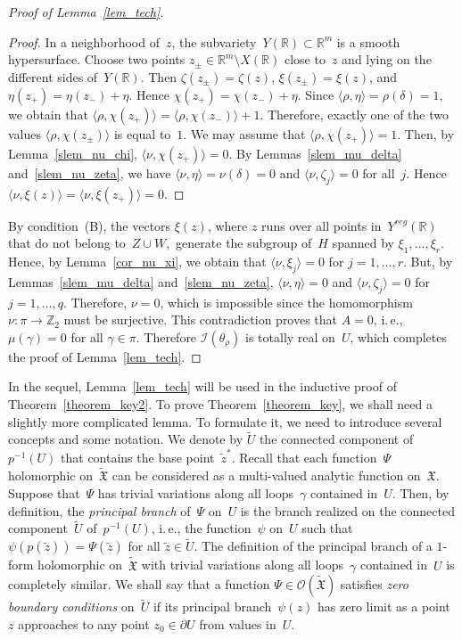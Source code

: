 \documentclass[reqno,tbtags,12pt]{amsart}
\numberwithin{equation}{section}
\newcommand{\R}{\mathbb{R}}
\newcommand{\Z}{\mathbb{Z}}
\newcommand{\FX}{\mathfrak{X}}
\newcommand{\tFX}{\widetilde{\mathfrak{X}}}
\newcommand{\CO}{\mathcal{O}}
\newcommand{\tU}{\widetilde{U}}
\newcommand{\I}{\mathcal{I}}
\newcommand{\tz}{\tilde{z}}
\theoremstyle{definition}
\begin{document}
\begin{proof}[Proof of Lemma~\ref{lem_tech}]
\begin{proof}
In a neighborhood of~$z$, the subvariety~$Y(\R)\subset\R^m$ is a smooth hypersurface. Choose two points $z_{\pm}\in \R^m\setminus X(\R)$ close to~$z$ and lying on the different sides of~$Y(\R)$. Then $\zeta(z_{\pm})=\zeta(z)$, $\xi(z_{\pm})=\xi(z)$, and $\eta(z_{+})= \eta(z_-)+\eta$. Hence $\chi(z_+)=\chi(z_-)+\eta$. Since $\langle\rho,\eta\rangle=\rho(\delta)=1$, we obtain that $\langle\rho,\chi(z_+)\rangle=\langle\rho,\chi(z_-)\rangle+1$. Therefore, exactly one of the two values $\langle\rho,\chi(z_{\pm})\rangle$ is equal to~$1$. We may assume that $\langle\rho,\chi(z_{+})\rangle=1$. Then, by Lemma~\ref{slem_nu_chi}, $\langle\nu,\chi(z_{+})\rangle=0$. By Lemmas~\ref{slem_mu_delta} and~\ref{slem_nu_zeta}, we have $\langle\nu,\eta\rangle=\nu(\delta)=0$ and $\langle\nu,\zeta_j\rangle=0$ for all~$j$. Hence $\langle\nu,\xi(z)\rangle=\langle\nu,\xi(z_+)\rangle=0$.
\end{proof}

By condition~(B), the vectors $\xi(z)$, where $z$ runs over all points in~$Y^{reg}(\R)$ that do not belong to~$Z\cup W,$ generate the subgroup of~$H$ spanned by $\xi_1,\ldots,\xi_r$. Hence, by Lemma~\ref{cor_nu_xi}, we obtain that $\langle\nu,\xi_j\rangle=0$ for $j=1,\ldots,r$. But, by Lemmas~\ref{slem_mu_delta} and~\ref{slem_nu_zeta}, $\langle\nu,\eta\rangle=0$ and $\langle\nu,\zeta_j\rangle=0$ for $j=1,\ldots,q$. Therefore, $\nu=0$, which is impossible since the homomorphism $\nu\colon\pi\to\Z_2$ must be surjective. This contradiction proves that $A=0$, i.\,e., $\mu(\gamma)=0$ for all $\gamma\in\pi$. Therefore $\I(\theta_{\rho})$ is totally real on~$U$, which completes the proof of Lemma~\ref{lem_tech}.  
\end{proof}

In the sequel, Lemma~\ref{lem_tech} will be used in the inductive proof of Theorem~\ref{theorem_key2}. To prove Theorem~\ref{theorem_key}, we shall need a slightly more complicated lemma. To formulate it, we need to introduce several concepts and some notation. We denote by $\tU$ the connected component of~$p^{-1}(U)$  that contains  the base point~$\tz^*$. Recall that each function~$\Psi$ holomorphic on~$\tFX$ can be considered as a multi-valued analytic function on~$\FX$. Suppose that~$\Psi$ has trivial variations along all loops~$\gamma$ contained in~$U$. Then, by definition, the \textit{principal branch\/} of~$\Psi$ on~$U$ is the branch realized on the connected component~$\tU$ of~$p^{-1}(U)$, i.\,e., the function~$\psi$ on~$U$ such that $\psi(p(\tz))=\Psi(\tz)$ for all $\tz\in\tU$.  The definition of the principal branch of a $1$-form holomorphic on~$\tFX$ with trivial variations along all loops~$\gamma$ contained in~$U$ is completely similar. We shall say that a function $\Psi\in\CO(\tFX)$ satisfies \textit{zero boundary conditions\/} on~$\tU$ if its principal branch~$\psi(z)$ has zero limit as a point~$z$ approaches to any point $z_0\in\partial U$ from values in~$U$. 
 
\end{document}
